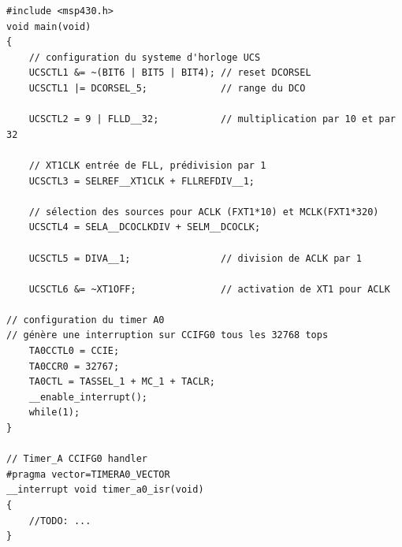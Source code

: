 \lstset{style=customc}
\begin{lstlisting}
#include <msp430.h>
void main(void)
{
	// configuration du systeme d'horloge UCS
	UCSCTL1 &= ~(BIT6 | BIT5 | BIT4); // reset DCORSEL
	UCSCTL1 |= DCORSEL_5;             // range du DCO

	UCSCTL2 = 9 | FLLD__32;           // multiplication par 10 et par 32

	// XT1CLK entrée de FLL, prédivision par 1
	UCSCTL3 = SELREF__XT1CLK + FLLREFDIV__1;

	// sélection des sources pour ACLK (FXT1*10) et MCLK(FXT1*320)
	UCSCTL4 = SELA__DCOCLKDIV + SELM__DCOCLK;

	UCSCTL5 = DIVA__1;                // division de ACLK par 1

	UCSCTL6 &= ~XT1OFF;               // activation de XT1 pour ACLK

// configuration du timer A0
// génère une interruption sur CCIFG0 tous les 32768 tops
	TA0CCTL0 = CCIE;
	TA0CCR0 = 32767;
	TA0CTL = TASSEL_1 + MC_1 + TACLR;
	__enable_interrupt();
	while(1);
}

// Timer_A CCIFG0 handler
#pragma vector=TIMERA0_VECTOR
__interrupt void timer_a0_isr(void)
{
	//TODO: ...
}
\end{lstlisting}
